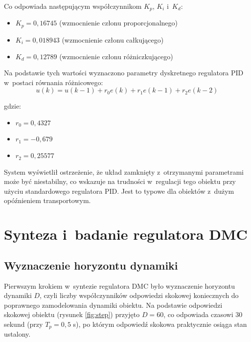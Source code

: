 \documentclass[a4paper,titlepage,11pt,floatssmall]{mwrep}
\begin{document}
Co odpowiada następującym współczynnikom $K_p$, $K_i$ i~$K_d$:
\begin{itemize}
    \item $K_p = 0,16745$ (wzmocnienie członu proporcjonalnego)
    \item $K_i = 0,018943$ (wzmocnienie członu całkującego)
    \item $K_d = 0,12789$ (wzmocnienie członu różniczkującego)
\end{itemize}

Na podstawie tych wartości wyznaczono parametry dyskretnego regulatora PID w~postaci równania różnicowego:
\begin{equation}
    u(k) = u(k-1) + r_0 e(k) + r_1 e(k-1) + r_2 e(k-2)
\end{equation}

gdzie:
\begin{itemize}
    \item $r_0 = 0,4327$
    \item $r_1 = -0,679$
    \item $r_2 = 0,25577$
\end{itemize}

System wyświetlił ostrzeżenie, że układ zamknięty z~otrzymanymi parametrami może być niestabilny, co wskazuje na trudności w~regulacji tego obiektu przy użyciu standardowego regulatora PID. Jest to typowe dla obiektów z~dużym opóźnieniem transportowym.

\section{Synteza i~badanie regulatora DMC}

\subsection{Wyznaczenie horyzontu dynamiki}

Pierwszym krokiem w~syntezie regulatora DMC było wyznaczenie horyzontu dynamiki $D$, czyli liczby współczynników odpowiedzi skokowej koniecznych do poprawnego zamodelowania dynamiki obiektu. Na podstawie odpowiedzi skokowej obiektu (rysunek \ref{fig:step}) przyjęto $D = 60$, co odpowiada czasowi $30$ sekund (przy $T_p = 0,5$ s), po którym odpowiedź skokowa praktycznie osiąga stan ustalony.
\end{document}
